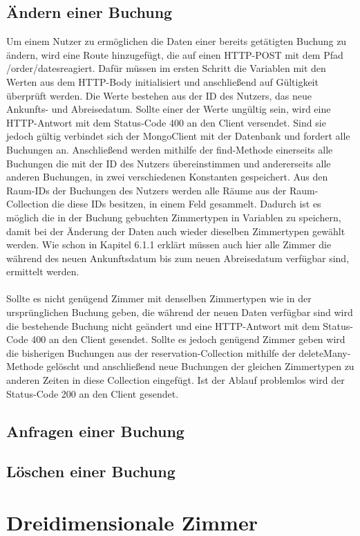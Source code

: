 \subsection{Ändern einer Buchung}
Um einem Nutzer zu ermöglichen die Daten einer bereits getätigten Buchung zu ändern, wird eine Route hinzugefügt, die auf einen HTTP-POST mit dem Pfad \glqq /order/dates\grqq \thinspace reagiert. Dafür müssen im ersten Schritt die Variablen mit den Werten aus dem HTTP-Body initialisiert und anschließend auf Gültigkeit überprüft werden. Die Werte bestehen aus der ID des Nutzers, das neue Ankunfts- und Abreisedatum. Sollte einer der Werte ungültig sein, wird eine HTTP-Antwort mit dem Status-Code 400 an den Client versendet. Sind sie jedoch gültig verbindet sich der MongoClient mit der Datenbank und fordert alle Buchungen an. Anschließend werden mithilfe der find-Methode einerseits alle Buchungen die mit der ID des Nutzers übereinstimmen und andererseits alle anderen Buchungen, in zwei verschiedenen Konstanten gespeichert. Aus den Raum-IDs der Buchungen des Nutzers werden alle Räume aus der Raum-Collection die diese IDs besitzen, in einem Feld gesammelt. Dadurch ist es möglich die in der Buchung gebuchten Zimmertypen in Variablen zu speichern, damit bei der Änderung der Daten auch wieder dieselben Zimmertypen gewählt werden. Wie schon in Kapitel 6.1.1 erklärt müssen auch hier alle Zimmer die während des neuen Ankunftsdatum bis zum neuen Abreisedatum verfügbar sind, ermittelt werden.
\\
\\
Sollte es nicht genügend Zimmer mit denselben Zimmertypen wie in der ursprünglichen Buchung geben, die während der neuen Daten verfügbar sind wird die bestehende Buchung nicht geändert und eine HTTP-Antwort mit dem Status-Code 400 an den Client gesendet. Sollte es jedoch genügend Zimmer geben wird die bisherigen Buchungen aus der \glqq reservation\grqq-Collection mithilfe der \glqq deleteMany\grqq-Methode gelöscht und anschließend neue Buchungen der gleichen Zimmertypen zu anderen Zeiten in diese Collection eingefügt. Ist der Ablauf problemlos wird der Status-Code 200 an den Client gesendet.

\subsection{Anfragen einer Buchung}

\subsection{Löschen einer Buchung}

\section{Dreidimensionale Zimmer}